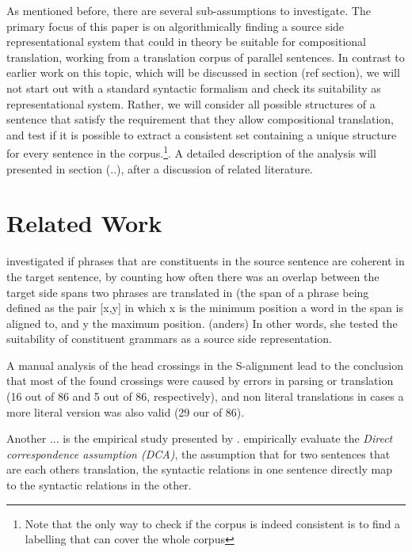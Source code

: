 \documentclass{report}
\theoremstyle{definition}
\theoremstyle{plain}
\begin{document}
As mentioned before, there are several sub-assumptions to investigate. The primary focus of this paper is on algorithmically finding a source side representational system that could in theory be suitable for compositional translation, working from a translation corpus of parallel sentences. In contrast to earlier work on this topic, which will be discussed in section (ref section), we will not start out with a standard syntactic formalism and check its suitability as representational system. Rather, we will consider all possible structures of a sentence that satisfy the requirement that they allow compositional translation, and test if it is possible to extract a consistent set containing a unique structure for every sentence in the corpus.\footnote{Note that the only way to check if the corpus is indeed consistent is to find a labelling that can cover the whole corpus}. A detailed description of the analysis will presented in section (..), after a discussion of related literature.

\section{Related Work}


\cite{fox2002phrasal} investigated if phrases that are constituents in the source sentence are coherent in the target sentence, by counting how often there was an overlap between the target side spans two phrases are translated in (the span of a phrase being defined as the pair [x,y] in which x is the minimum position a word in the span is aligned to, and y the maximum position. (anders) In other words, she tested the suitability of constituent grammars as a source side representation. 

A manual analysis of the head crossings in the S-alignment lead to the conclusion that most of the found crossings were caused by errors in parsing or translation (16 out of 86 and 5 out of 86, respectively), and non literal translations in cases a more literal version was also valid (29 our of 86).

Another ... is the empirical study presented by \cite{hwa2002evaluating}. \citeauthor{hwa2002evaluating} empirically evaluate the \textit{Direct correspondence assumption (DCA)}, the assumption that for two sentences that are each others translation, the syntactic relations in one sentence directly map to the syntactic relations in the other.
\end{document}
